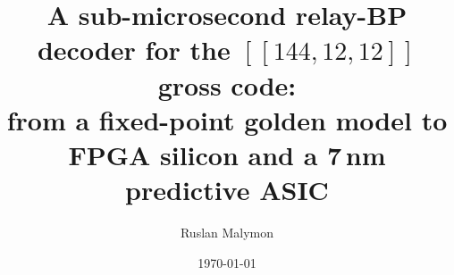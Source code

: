 \documentclass[10pt,twocolumn]{article}
\title{A sub-microsecond relay-BP decoder for the $[[144,12,12]]$ gross code:\\
from a fixed-point golden model to FPGA silicon and a 7\,nm predictive ASIC}
\author{Ruslan Malymon}
\date{\today}
\begin{document}
\maketitle

\begin{abstract}

\end{abstract}












\appendix
\onecolumn

\end{document}
